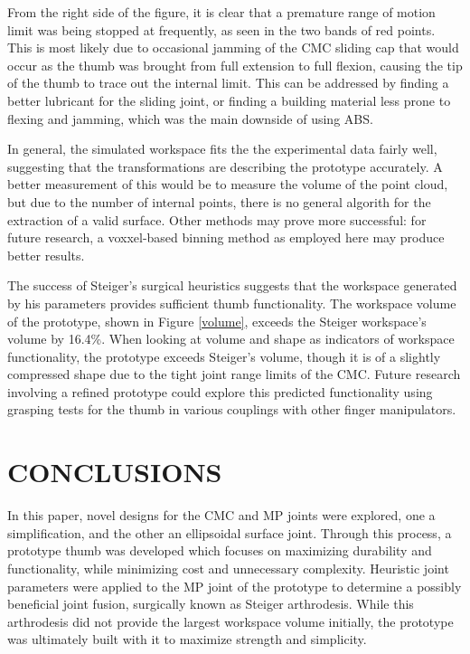 \documentclass[letterpaper, 10 pt, conference]{ieeeconf}  %
\newcommand{\rFig}[1]{Figure \ref{#1}}
\begin{document}
From the right side of the figure, it is clear that a premature range of motion limit was being stopped at frequently, as seen in the two bands of red points. This is most likely due to occasional jamming of the CMC sliding cap that would occur as the thumb was brought from full extension to full flexion, causing the tip of the thumb to trace out the internal limit. This can be addressed by finding a better lubricant for the sliding joint, or finding a building material less prone to flexing and jamming, which was the main downside of using ABS. 

In general, the simulated workspace fits the the experimental data fairly well, suggesting that the transformations are describing the prototype accurately. A better measurement of this would be to measure the volume of the point cloud, but due to the number of internal points, there is no general algorith for the extraction of a valid surface. Other methods may prove more successful: for future research, a voxxel-based binning method as employed here \cite{Bullock} may produce better results.

The success of Steiger's surgical heuristics suggests that the workspace generated by his parameters provides sufficient thumb functionality. The workspace volume of the prototype, shown in \rFig{volume}, exceeds the Steiger workspace's volume by 16.4\%. When looking at volume and shape as indicators of workspace functionality, the prototype exceeds Steiger's volume, though it is of a slightly compressed shape due to the tight joint range limits of the CMC. Future research involving a refined prototype could explore this predicted functionality using grasping tests for the thumb in various couplings with other finger manipulators. 

\section{CONCLUSIONS}

In this paper, novel designs for the CMC and MP joints were explored, one a simplification, and the other an ellipsoidal surface joint. Through this process, a prototype thumb was developed which focuses on maximizing durability and functionality, while minimizing cost and unnecessary complexity. Heuristic joint parameters \cite{Steiger} were applied to the MP joint of the prototype to determine a possibly beneficial joint fusion, surgically known as Steiger arthrodesis. While this arthrodesis did not provide the largest workspace volume initially, the prototype was ultimately built with it to maximize strength and simplicity.
\end{document}
